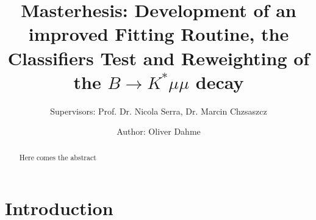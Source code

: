 \documentclass[english]{uzhpub}
\begin{document}
\title{Masterhesis: Development of an improved Fitting Routine, the Classifiers Test and Reweighting of the $B \rightarrow K^* \mu \mu$ decay}
\subtitle{Supervisors: Prof. Dr. Nicola Serra, Dr. Marcin Chzsaszcz}

\author{Author: Oliver Dahme}


\maketitle




\begin{abstract}
 Here comes the abstract
\end{abstract}

\tableofcontents


\section{Introduction}

\end{document}
